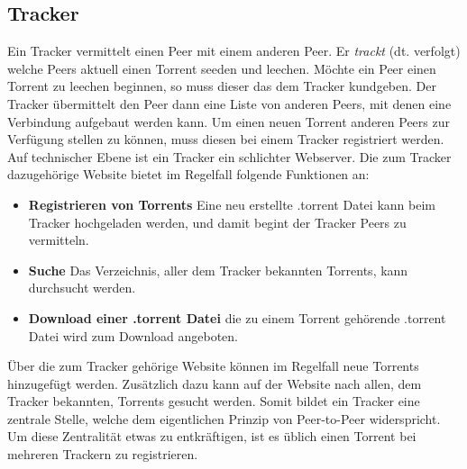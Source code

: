 \subsection{Tracker}
Ein Tracker vermittelt einen Peer mit einem anderen Peer. Er \emph{trackt} (dt. verfolgt) welche Peers aktuell einen Torrent seeden und leechen. Möchte ein Peer einen Torrent zu leechen beginnen, so muss dieser das dem Tracker kundgeben. Der Tracker übermittelt den Peer dann eine Liste von anderen Peers, mit denen eine Verbindung aufgebaut werden kann.
Um einen neuen Torrent anderen Peers zur Verfügung stellen zu können, muss diesen bei einem Tracker registriert werden.
Auf technischer Ebene ist ein Tracker ein schlichter Webserver. Die zum Tracker dazugehörige Website bietet im Regelfall folgende Funktionen an:
\begin{itemize}
    \item \textbf{Registrieren von Torrents} Eine neu erstellte .torrent Datei kann beim Tracker hochgeladen werden, und damit begint der Tracker Peers zu vermitteln. 
    \item \textbf{Suche} Das Verzeichnis, aller dem Tracker bekannten Torrents, kann durchsucht werden. 
    \item \textbf{Download einer .torrent Datei} die zu einem Torrent gehörende .torrent Datei wird zum Download angeboten. 
\end{itemize}

Über die zum Tracker gehörige Website können im Regelfall neue Torrents hinzugefügt werden. Zusätzlich dazu kann auf der Website nach allen, dem Tracker bekannten, Torrents gesucht werden. 
Somit bildet ein Tracker eine zentrale Stelle, welche dem eigentlichen Prinzip von Peer-to-Peer widerspricht. Um diese Zentralität etwas zu entkräftigen, ist es üblich einen Torrent bei mehreren Trackern zu registrieren.
